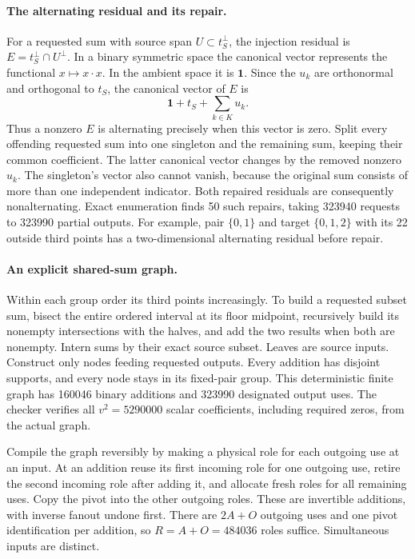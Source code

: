 \paragraph{The alternating residual and its repair.}
For a requested sum with source span $U\subset t_S^\perp$, the injection
residual is $E=t_S^\perp\cap U^\perp$. In a binary symmetric space the
canonical vector represents the functional $x\mapsto x\cdot x$.
In the ambient space it is $\mathbf1$. Since the $u_k$ are orthonormal
and orthogonal to $t_S$, the canonical vector of $E$ is
\[
 \mathbf1+t_S+\sum_{k\in K}u_k.
\]
Thus a nonzero $E$ is alternating precisely when this vector is zero.
Split every offending requested sum into one singleton and the remaining
sum, keeping their common coefficient. The latter canonical vector changes
by the removed nonzero $u_k$. The singleton's vector also cannot vanish,
because the original sum consists of more than one independent indicator.
Both repaired residuals are consequently nonalternating. Exact enumeration
finds 50 such repairs, taking 323940 requests to 323990 partial outputs.
For example, pair $\{0,1\}$ and target $\{0,1,2\}$ with its 22 outside
third points has a two-dimensional alternating residual before repair.

\paragraph{An explicit shared-sum graph.}
Within each group order its third points increasingly. To build a requested
subset sum, bisect the entire ordered interval at its floor midpoint,
recursively build its nonempty intersections with the halves, and add the
two results when both are nonempty. Intern sums by their exact source subset.
Leaves are source inputs. Construct only nodes feeding requested outputs.
Every addition has disjoint supports, and every node stays in its fixed-pair
group. This deterministic finite graph has 160046 binary additions and
323990 designated output uses. The checker verifies all $v^2=5290000$
scalar coefficients, including required zeros, from the actual graph.

Compile the graph reversibly by making a physical role for each outgoing
use at an input. At an addition reuse its first incoming role for one
outgoing use, retire the second incoming role after adding it, and allocate
fresh roles for all remaining uses. Copy the pivot into the other outgoing
roles. These are invertible additions, with inverse fanout undone first.
There are $2A+O$ outgoing uses and one pivot identification per addition,
so $R=A+O=484036$ roles suffice. Simultaneous inputs are distinct.

